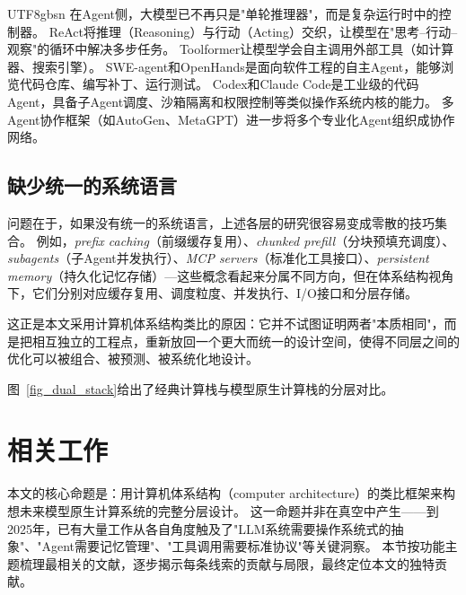\documentclass[11pt,a4paper]{article}
\begin{document}
\begin{CJK*}{UTF8}{gbsn}
在Agent侧，大模型已不再只是"单轮推理器"，而是复杂运行时中的控制器。
ReAct\cite{yao2023react}将推理（Reasoning）与行动（Acting）交织，让模型在"思考--行动--观察"的循环中解决多步任务。
Toolformer\cite{schick2023toolformer}让模型学会自主调用外部工具（如计算器、搜索引擎）。
SWE-agent\cite{sweagent2024}和OpenHands\cite{openhands_paper_2025}是面向软件工程的自主Agent，能够浏览代码仓库、编写补丁、运行测试。
Codex\cite{openai_codex_overview_2026}和Claude Code\cite{anthropic_claudecode_overview_2026}是工业级的代码Agent，具备子Agent调度\cite{openai_codex_subagents_2026,anthropic_claudecode_subagents_2026}、沙箱隔离\cite{openai_codex_sandbox_2026,anthropic_claudecode_sandbox_2026}和权限控制\cite{openai_codex_approvals_2026,anthropic_claudecode_security_2026}等类似操作系统内核的能力。
多Agent协作框架（如AutoGen\cite{wu2023autogen}、MetaGPT\cite{metagpt2023}）进一步将多个专业化Agent组织成协作网络。

\subsection{缺少统一的系统语言}

问题在于，如果没有统一的系统语言，上述各层的研究很容易变成零散的技巧集合。
例如，\emph{prefix caching}（前缀缓存复用）、\emph{chunked prefill}（分块预填充调度）、\emph{subagents}（子Agent并发执行）、\emph{MCP servers}（标准化工具接口）、\emph{persistent memory}（持久化记忆存储）---这些概念看起来分属不同方向，但在体系结构视角下，它们分别对应缓存复用、调度粒度、并发执行、I/O接口和分层存储。

这正是本文采用计算机体系结构类比的原因：它并不试图证明两者"本质相同"，而是把相互独立的工程点，重新放回一个更大而统一的设计空间，使得不同层之间的优化可以被组合、被预测、被系统化地设计。

图~\ref{fig_dual_stack}给出了经典计算栈与模型原生计算栈的分层对比。


\section{相关工作}
\label{sec:related}

本文的核心命题是：用计算机体系结构（computer architecture）的类比框架来构想未来模型原生计算系统的完整分层设计。
这一命题并非在真空中产生——到2025年，已有大量工作从各自角度触及了"LLM系统需要操作系统式的抽象"、"Agent需要记忆管理"、"工具调用需要标准协议"等关键洞察。
本节按功能主题梳理最相关的文献，逐步揭示每条线索的贡献与局限，最终定位本文的独特贡献。


\end{CJK*}
\end{document}
